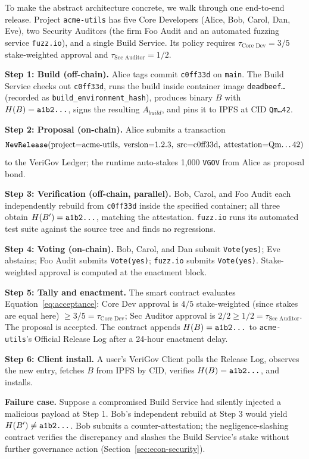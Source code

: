 \documentclass{article}
\begin{document}
To make the abstract architecture concrete, we walk through one end-to-end release. Project \texttt{acme-utils} has five Core Developers (Alice, Bob, Carol, Dan, Eve), two Security Auditors (the firm Foo Audit and an automated fuzzing service \texttt{fuzz.io}), and a single Build Service. Its policy requires $\tau_{\text{Core Dev}} = 3/5$ stake-weighted approval and $\tau_{\text{Sec Auditor}} = 1/2$.

\textbf{Step 1: Build (off-chain).} Alice tags commit \texttt{c0ff33d} on \texttt{main}. The Build Service checks out \texttt{c0ff33d}, runs the build inside container image \texttt{deadbeef\dots} (recorded as \texttt{build\_environment\_hash}), produces binary $B$ with $H(B) = \texttt{a1b2\dots}$, signs the resulting $A_{build}$, and pins it to IPFS at CID \texttt{Qm\dots42}.

\textbf{Step 2: Proposal (on-chain).} Alice submits a transaction
\[
\texttt{NewRelease}(\text{project=acme-utils},\;\text{version=1.2.3},\;\text{src=c0ff33d},\;\text{attestation=Qm\dots42})
\]
to the VeriGov Ledger; the runtime auto-stakes 1{,}000 \texttt{VGOV} from Alice as proposal bond.

\textbf{Step 3: Verification (off-chain, parallel).} Bob, Carol, and Foo Audit each independently rebuild from \texttt{c0ff33d} inside the specified container; all three obtain $H(B') = \texttt{a1b2\dots}$, matching the attestation. \texttt{fuzz.io} runs its automated test suite against the source tree and finds no regressions.

\textbf{Step 4: Voting (on-chain).} Bob, Carol, and Dan submit \texttt{Vote(yes)}; Eve abstains; Foo Audit submits \texttt{Vote(yes)}; \texttt{fuzz.io} submits \texttt{Vote(yes)}. Stake-weighted approval is computed at the enactment block.

\textbf{Step 5: Tally and enactment.} The smart contract evaluates Equation~\ref{eq:acceptance}: Core Dev approval is $4/5$ stake-weighted (since stakes are equal here) $\geq 3/5 = \tau_{\text{Core Dev}}$; Sec Auditor approval is $2/2 \geq 1/2 = \tau_{\text{Sec Auditor}}$. The proposal is accepted. The contract appends $H(B) = \texttt{a1b2\dots}$ to \texttt{acme-utils}'s Official Release Log after a 24-hour enactment delay.

\textbf{Step 6: Client install.} A user's VeriGov Client polls the Release Log, observes the new entry, fetches $B$ from IPFS by CID, verifies $H(B) = \texttt{a1b2\dots}$, and installs.

\textbf{Failure case.} Suppose a compromised Build Service had silently injected a malicious payload at Step 1. Bob's independent rebuild at Step 3 would yield $H(B') \neq \texttt{a1b2\dots}$. Bob submits a counter-attestation; the negligence-slashing contract verifies the discrepancy and slashes the Build Service's stake without further governance action (Section~\ref{sec:econ-security}).
\end{document}
